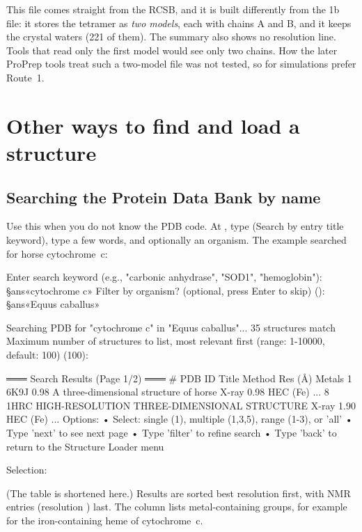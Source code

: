 This file comes straight from the RCSB, and it is built differently from the
1b file: it stores the tetramer as \emph{two models}, each with chains A and B,
and it keeps the crystal waters (221 of them). The summary also shows no
resolution line. Tools that read only the first model would see only two
chains. How the later ProPrep tools treat such a two-model file was not tested,
so for simulations prefer Route~1.

\section{Other ways to find and load a structure}
\label{sec:structure-other}

\subsection{Searching the Protein Data Bank by name}
\label{sec:structure-search}

Use this when you do not know the PDB code. At , type
 (Search by entry title keyword), type a few words, and optionally an
organism. The example searched for horse cytochrome~c:
\begin{screen}
Enter search keyword (e.g., "carbonic anhydrase", "SOD1", "hemoglobin"):
§ans«cytochrome c»
Filter by organism? (optional, press Enter to skip) (): §ans«Equus caballus»

Searching PDB for "cytochrome c" in "Equus caballus"...
35 structures match
Maximum number of structures to list, most relevant first (range: 1-10000,
default: 100) (100):

═══ Search Results (Page 1/2) ═══
 #   PDB ID  Title                                          Method  Res (Å)  Metals
 1   6K9J    0.98 A three-dimensional structure of horse    X-ray   0.98     HEC (Fe)
...
 8   1HRC    HIGH-RESOLUTION THREE-DIMENSIONAL STRUCTURE    X-ray   1.90     HEC (Fe)
...
Options:
  • Select: single (1), multiple (1,3,5), range (1-3), or 'all'
  • Type 'next' to see next page
  • Type 'filter' to refine search
  • Type 'back' to return to the Structure Loader menu

Selection:
\end{screen}
(The table is shortened here.) Results are sorted best resolution first, with
NMR entries (resolution ) last. The  column lists
metal-containing groups, for example  for the iron-containing
heme of cytochrome~c.

